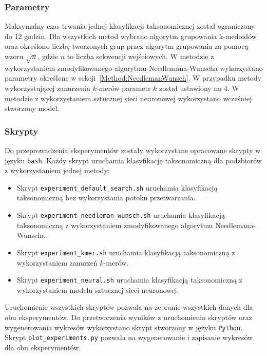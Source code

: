         \subsubsection{Parametry}

            Maksymalny czas trwania jednej klasyfikacji taksonomicznej został ograniczony do 12 godzin. Dla wszystkich metod wybrano algorytm grupowania k-medoidów oraz określono liczbę tworzonych grup przez algorytm grupowania za pomocą wzoru $\sqrt{n}$, gdzie $n$ to liczba sekwencji wejściowych. W metodzie z wykorzystaniem zmodyfikowanego algorytmu Needlemana-Wunscha wykorzystano parametry określone w sekcji~\ref{Method:NeedlemanWunsch}. W przypadku metody wykorzystującej zanurzenia $k$-merów parametr $k$ został ustawiony na $4$. W metodzie z wykorzystaniem sztucznej sieci neuronowej wykorzystano wcześniej stworzony model.

        \subsubsection{Skrypty}

            Do przeprowadzenia eksperymentów zostały wykorzystane opracowane skrypty w języku \texttt{bash}. Każdy skrypt uruchamia klasyfikację taksonomiczną dla podzbiorów z wykorzystaniem jednej metody:

            \begin{itemize}
                \item {
                    Skrypt \texttt{experiment\_default\_search.sh} uruchamia klasyfikacją taksonomiczną bez wykorzystania potoku przetwarzania.
                }
                \item {
                    Skrypt \texttt{experiment\_needleman\_wunsch.sh} uruchamia klasyfikacją taksonomiczną z wykorzystaniem zmodyfikowanego algorytmu Needlemana-Wunscha.
                }
                \item {
                    Skrypt \texttt{experiment\_kmer.sh} uruchamia klasyfikacją taksonomiczną z wykorzystaniem zanurzeń $k$-merów.
                }
                \item {
                    Skrypt \texttt{experiment\_neural.sh} uruchamia klasyfikacją taksonomiczną z wykorzystaniem modelu sztucznej sieci neuronowej.
                }
            \end{itemize}

            Uruchomienie wszystkich skryptów pozwala na zebranie wszystkich danych dla obu eksperymentów. Do przetworzenia wyników z uruchomienia skryptów oraz wygenerowania wykresów wykorzystano skrypt stworzony w języku \texttt{Python}. Skrypt \texttt{plot\_experiments.py} pozwala na wygenerowanie i zapisanie wykresów dla obu eksperymentów.

